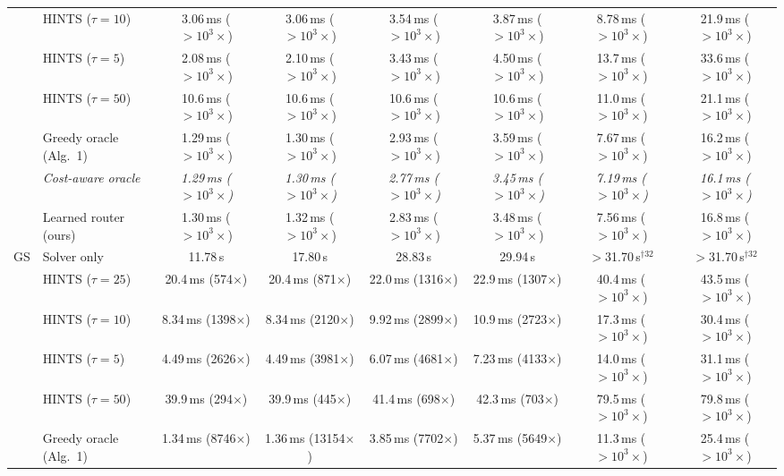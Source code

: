 {\begin{tabular}{llcccccc}
 & HINTS ($\tau{=}10$) & 3.06\,ms ($>10^{3}\times$) & 3.06\,ms ($>10^{3}\times$) & 3.54\,ms ($>10^{3}\times$) & 3.87\,ms ($>10^{3}\times$) & 8.78\,ms ($>10^{3}\times$) & 21.9\,ms ($>10^{3}\times$) \\
 & HINTS ($\tau{=}5$) & 2.08\,ms ($>10^{3}\times$) & 2.10\,ms ($>10^{3}\times$) & 3.43\,ms ($>10^{3}\times$) & 4.50\,ms ($>10^{3}\times$) & 13.7\,ms ($>10^{3}\times$) & 33.6\,ms ($>10^{3}\times$) \\
 & HINTS ($\tau{=}50$) & 10.6\,ms ($>10^{3}\times$) & 10.6\,ms ($>10^{3}\times$) & 10.6\,ms ($>10^{3}\times$) & 10.6\,ms ($>10^{3}\times$) & 11.0\,ms ($>10^{3}\times$) & 21.1\,ms ($>10^{3}\times$) \\
 & Greedy oracle (Alg.~1) & 1.29\,ms ($>10^{3}\times$) & 1.30\,ms ($>10^{3}\times$) & 2.93\,ms ($>10^{3}\times$) & 3.59\,ms ($>10^{3}\times$) & 7.67\,ms ($>10^{3}\times$) & 16.2\,ms ($>10^{3}\times$) \\
 & \textit{Cost-aware oracle} & \textit{1.29\,ms ($>10^{3}\times$)} & \textit{1.30\,ms ($>10^{3}\times$)} & \textit{2.77\,ms ($>10^{3}\times$)} & \textit{3.45\,ms ($>10^{3}\times$)} & \textit{7.19\,ms ($>10^{3}\times$)} & \textit{16.1\,ms ($>10^{3}\times$)} \\
 & Learned router (ours) & 1.30\,ms ($>10^{3}\times$) & 1.32\,ms ($>10^{3}\times$) & 2.83\,ms ($>10^{3}\times$) & 3.48\,ms ($>10^{3}\times$) & 7.56\,ms ($>10^{3}\times$) & 16.8\,ms ($>10^{3}\times$) \\
\midrule
GS & Solver only & 11.78\,s & 17.80\,s & 28.83\,s & 29.94\,s & $>$31.70\,s$^{\dagger 32}$ & $>$31.70\,s$^{\dagger 32}$ \\
 & HINTS ($\tau{=}25$) & 20.4\,ms (574$\times$) & 20.4\,ms (871$\times$) & 22.0\,ms (1316$\times$) & 22.9\,ms (1307$\times$) & 40.4\,ms ($>10^{3}\times$) & 43.5\,ms ($>10^{3}\times$) \\
 & HINTS ($\tau{=}10$) & 8.34\,ms (1398$\times$) & 8.34\,ms (2120$\times$) & 9.92\,ms (2899$\times$) & 10.9\,ms (2723$\times$) & 17.3\,ms ($>10^{3}\times$) & 30.4\,ms ($>10^{3}\times$) \\
 & HINTS ($\tau{=}5$) & 4.49\,ms (2626$\times$) & 4.49\,ms (3981$\times$) & 6.07\,ms (4681$\times$) & 7.23\,ms (4133$\times$) & 14.0\,ms ($>10^{3}\times$) & 31.1\,ms ($>10^{3}\times$) \\
 & HINTS ($\tau{=}50$) & 39.9\,ms (294$\times$) & 39.9\,ms (445$\times$) & 41.4\,ms (698$\times$) & 42.3\,ms (703$\times$) & 79.5\,ms ($>10^{3}\times$) & 79.8\,ms ($>10^{3}\times$) \\
 & Greedy oracle (Alg.~1) & 1.34\,ms (8746$\times$) & 1.36\,ms (13154$\times$) & 3.85\,ms (7702$\times$) & 5.37\,ms (5649$\times$) & 11.3\,ms ($>10^{3}\times$) & 25.4\,ms ($>10^{3}\times$) \\

\end{tabular}}
